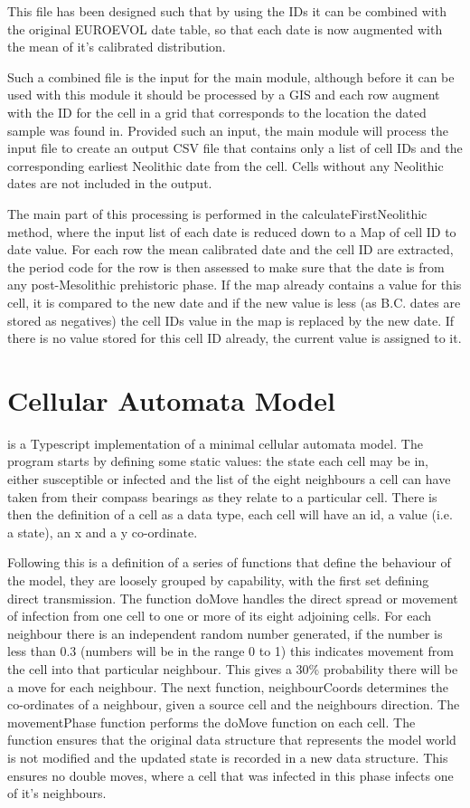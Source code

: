 This file has been designed such that by using the IDs it can be combined with the original EUROEVOL date table, so that each date is now augmented with the mean of it's calibrated distribution.

Such a combined file is the input for the main module, although before it can be used with this module it should be processed by a GIS and each row augment with the ID for the cell in a grid that corresponds to the location the dated sample was found in. Provided such an input, the main module will process the input file to create an output CSV file that contains only a list of cell IDs and the corresponding earliest Neolithic date from the cell. Cells without any Neolithic dates are not included in the output. 

The main part of this processing is performed in the calculateFirstNeolithic method, where the input list of each date is reduced down to a Map of cell ID to date value. For each row the mean calibrated date and the cell ID are extracted, the period code for the row is then assessed to make sure that the date is from any post-Mesolithic prehistoric phase. If the map already contains a value for this cell, it is compared to the new date and if the new value is less (as B.C. dates are stored as negatives) the cell IDs value in the map is replaced by the new date. If there is no value stored for this cell ID already, the current value is assigned to it.

\section{Cellular Automata Model}
\citet{doug_cowie_2018_1297319} is a Typescript implementation of a minimal cellular automata model. The program starts by defining some static values: the state each cell may be in, either susceptible or infected and the list of the eight neighbours a cell can have taken from their compass bearings as they relate to a particular cell. There is then the definition of a cell as a data type, each cell will have an id, a value (i.e. a state), an x and a y co-ordinate. 

Following this is a definition of a series of functions that define the behaviour of the model, they are loosely grouped by capability, with the first set defining direct transmission. The function doMove handles the direct spread or movement of infection from one cell to one or more of its eight adjoining cells. For each neighbour there is an independent random number generated, if the number is less than 0.3 (numbers will be in the range 0 to 1) this indicates movement from the cell into that particular neighbour. This gives a 30\% probability there will be a move for each neighbour. The next function, neighbourCoords determines the co-ordinates of a neighbour, given a source cell and the neighbours direction. The movementPhase function performs the doMove function on each cell. The function ensures that the original data structure that represents the model world is not modified and the updated state is recorded in a new data structure. This ensures no double moves, where a cell that was infected in this phase infects one of it's neighbours.

